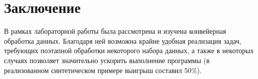 \chapter*{Заключение}

В рамках лабораторной работы была рассмотрена и изучена конвейерная обработка данных.
Благодаря ней возможна крайне удобная реализация задач, требующих поэтапной обработки некоторого набора данных, а также в некоторых случаях позволяет значительно ускорить выполнение программы (в реализованном синтетическом примере выигрыш составил 50\%).